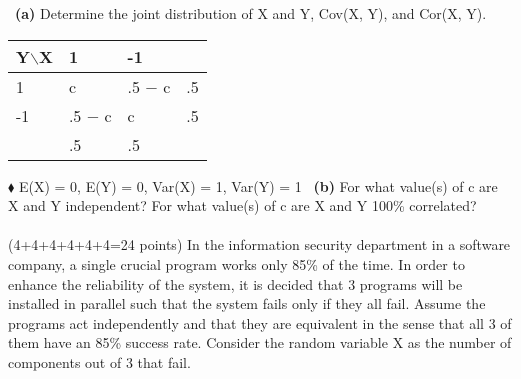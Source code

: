 \documentclass[a4 paper]{article}
\numberwithin{equation}{section}
\newcommand{\problem}[2]{~\\\fbox{\textbf{Problem #1}}\hfill (#2 points)\newline\newline}
\newcommand{\subproblem}[1]{~\newline\textbf{(#1)}}
\newcommand{\0}{\mathbf{0}}
\begin{document}
\subproblem{a} Determine the joint distribution of X and Y, Cov(X, Y), and Cor(X, Y).\\
\begin{center}
\begin{tabular}{ | m{1cm} | m{1cm}| m{1cm} | m{1cm} | } 
\hline
Y$\backslash$X& 1 & -1 &  \\ 
\hline
1 & c & .5 $-$ c & .5 \\ 
\hline
-1 & .5 $-$ c & c & .5 \\
\hline
 & .5 & .5 & \\ 
\hline
\end{tabular}
\end{center}
{\color{teal} $\blacklozenge$ E(X) = 0, E(Y) = 0, Var(X) = 1, Var(Y) = 1}
\newline {}
\newline {}
\newline
\subproblem{b} For what value(s) of c are X and Y independent? For what value(s) of c are X and Y 100\% correlated?\\
\newline {}
\bigskip
\bigskip
\newpage
\problem{3:}{4+4+4+4+4+4=24}
In the information security department in a software company, a single crucial program works only 85\% of the time. In order to enhance the reliability of the system, it is decided that 3 programs will be installed in parallel such that the system fails only if they all fail. Assume the programs act independently and that they are equivalent in the sense that all 3 of them have an 85\% success rate. Consider the random variable X as the number of components out of 3 that fail.\\
\end{document}
